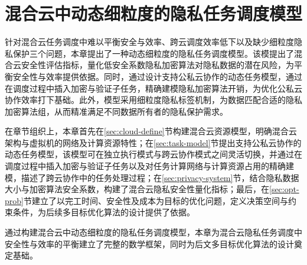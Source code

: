 \chapter{混合云中动态细粒度的隐私任务调度模型}\label{chapter:model}

针对混合云任务调度中难以平衡安全与效率、跨云调度效率低下以及缺少细粒度隐私保护三个问题，本章提出了一种动态细粒度的隐私任务调度模型。该模提出了混合云安全性评估指标，量化低安全系数隐私加密算法对隐私数据的潜在风险，为平衡安全性与效率提供依据。同时，通过设计支持公私云协作的动态任务模型，通过在调度过程中插入加密与验证子任务，精确建模隐私加密算法开销，为优化公私云协作效率打下基础。此外，模型采用细粒度隐私标签机制，为数据匹配合适的隐私加密算法组，从而精准满足不同数据所有者的隐私保护需求。

在章节组织上，本章首先在\ref{sec:cloud-define}节构建混合云资源模型，明确混合云架构与虚拟机的网络及计算资源特性；在\ref{sec:task-model}节提出支持公私云协作的动态任务模型，该模型可在独立执行模式与跨云协作模式之间灵活切换，并通过在调度过程中插入加密与验证子任务以及对任务计算网络与计算资源占用的精确建模，描述了跨云协作中的任务处理过程；在\ref{sec:privacy-system}节，结合隐私数据大小与加密算法安全系数，构建了混合云隐私安全性量化指标；最后，在\ref{sec:opt-prob}节建立了以完工时间、安全性及成本为目标的优化问题，定义决策空间与约束条件，为后续多目标优化算法的设计提供了依据。


通过构建混合云中动态细粒度的隐私任务调度模型，本章为混合云隐私任务调度中安全性与效率的平衡建立了完整的数学框架，同时为后文多目标优化算法的设计奠定基础。


